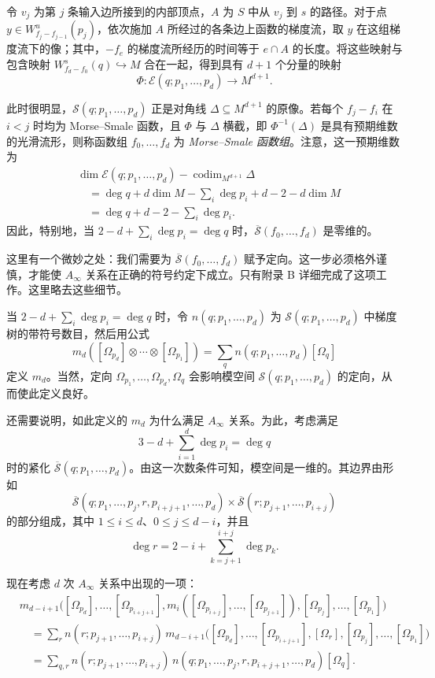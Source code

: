 令 $v_j$ 为第 $j$ 条输入边所接到的内部顶点，$A$ 为 $S$ 中从 $v_j$ 到 $s$ 的路径。对于点 $y\in W^u_{f_j-f_{j-1}}(p_j)$，依次施加 $A$ 所经过的各条边上函数的梯度流，取 $y$ 在这组梯度流下的像；其中，$-f_e$ 的梯度流所经历的时间等于 $e\cap A$ 的长度。将这些映射与包含映射 $W^s_{f_d-f_0}(q)\hookrightarrow M$ 合在一起，得到具有 $d+1$ 个分量的映射
\[
\Phi\colon\mathcal E(q;p_1,\ldots,p_d)\longrightarrow M^{d+1}.
\]

此时很明显，$\mathcal S(q;p_1,\ldots,p_d)$ 正是对角线 $\Delta\subseteq M^{d+1}$ 的原像。若每个 $f_j-f_i$ 在 $i<j$ 时均为 Morse--Smale 函数，且 $\Phi$ 与 $\Delta$ 横截，即 $\Phi^{-1}(\Delta)$ 是具有预期维数的光滑流形，则称函数组 $f_0,\ldots,f_d$ 为 \emph{Morse--Smale 函数组}。注意，这一预期维数为
\[
\begin{aligned}
&\dim\mathcal E(q;p_1,\ldots,p_d)-\operatorname{codim}_{M^{d+1}}\Delta\\
&\quad=\deg q+d\dim M-\sum_i\deg p_i+d-2-d\dim M\\
&\quad=\deg q+d-2-\sum_i\deg p_i.
\end{aligned}
\]
因此，特别地，当 $2-d+\sum_i\deg p_i=\deg q$ 时，$\overline{\mathcal S}(f_0,\ldots,f_d)$ 是零维的。

这里有一个微妙之处：我们需要为 $\overline{\mathcal S}(f_0,\ldots,f_d)$ 赋予定向。这一步必须格外谨慎，才能使 $A_\infty$ 关系在正确的符号约定下成立。只有附录 B 详细完成了这项工作。这里略去这些细节。

当 $2-d+\sum_i\deg p_i=\deg q$ 时，令 $n(q;p_1,\ldots,p_d)$ 为 $\mathcal S(q;p_1,\ldots,p_d)$ 中梯度树的带符号数目，然后用公式
\[
m_d([\Omega_{p_d}]\otimes\cdots\otimes[\Omega_{p_1}])
=\sum_q n(q;p_1,\ldots,p_d)[\Omega_q]
\]
定义 $m_d$。当然，定向 $\Omega_{p_1},\ldots,\Omega_{p_d},\Omega_q$ 会影响模空间 $\mathcal S(q;p_1,\ldots,p_d)$ 的定向，从而使此定义良好。

还需要说明，如此定义的 $m_d$ 为什么满足 $A_\infty$ 关系。为此，考虑满足
\[
3-d+\sum_{i=1}^d\deg p_i=\deg q
\]
时的紧化 $\overline{\mathcal S}(q;p_1,\ldots,p_d)$。由这一次数条件可知，模空间是一维的。其边界由形如
\[
\overline{\mathcal S}(q;p_1,\ldots,p_j,r,p_{i+j+1},\ldots,p_d)
\times\overline{\mathcal S}(r;p_{j+1},\ldots,p_{i+j})
\]
的部分组成，其中 $1\leq i\leq d$、$0\leq j\leq d-i$，并且
\[
\deg r=2-i+\sum_{k=j+1}^{i+j}\deg p_k.
\]

现在考虑 $d$ 次 $A_\infty$ 关系中出现的一项：
\[
\begin{aligned}
&m_{d-i+1}\bigl([\Omega_{p_d}],\ldots,[\Omega_{p_{i+j+1}}],
m_i([\Omega_{p_{i+j}}],\ldots,[\Omega_{p_{j+1}}]),
[\Omega_{p_j}],\ldots,[\Omega_{p_1}]\bigr)\\
&\quad=\sum_r n(r;p_{j+1},\ldots,p_{i+j})\,
m_{d-i+1}\bigl([\Omega_{p_d}],\ldots,[\Omega_{p_{i+j+1}}],
[\Omega_r],[\Omega_{p_j}],\ldots,[\Omega_{p_1}]\bigr)\\
&\quad=\sum_{q,r}n(r;p_{j+1},\ldots,p_{i+j})\,
n(q;p_1,\ldots,p_j,r,p_{i+j+1},\ldots,p_d)[\Omega_q].
\end{aligned}
\]


